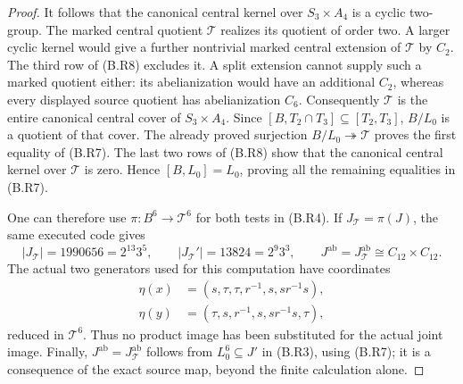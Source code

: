 \begin{proof}
It follows that the canonical central kernel over
$S_3\times A_4$ is a cyclic two-group.  The marked central
quotient $\mathcal T$ realizes its quotient of order two.
A larger cyclic kernel would give a further nontrivial
marked central extension of $\mathcal T$ by $C_2$.
The third row of (B.R8) excludes it.  A split extension
cannot supply such a marked quotient either: its
abelianization would have an additional $C_2$, whereas
every displayed source quotient has abelianization $C_6$.
Consequently $\mathcal T$ is the entire canonical central
cover of $S_3\times A_4$.  Since
$[B,T_2\cap T_3]\subseteq[T_2,T_3]$,
$B/L_0$ is a quotient of that cover.  The already proved
surjection $B/L_0\twoheadrightarrow\mathcal T$ proves
the first equality of (B.R7).  The last two rows of
(B.R8) show that the canonical central kernel over
$\mathcal T$ is zero.  Hence $[B,L_0]=L_0$, proving
all the remaining equalities in (B.R7).

One can therefore use $\pi:B^6\to\mathcal T^6$ for both
tests in (B.R4).  If $J_{\mathcal T}=\pi(J)$, the same
executed code gives
\[
 |J_{\mathcal T}|=1990656=2^{13}3^5,\qquad
 |J_{\mathcal T}'|=13824=2^9 3^3,\qquad
 J^{\mathrm{ab}}=J_{\mathcal T}^{\mathrm{ab}}
                 \cong C_{12}\times C_{12}.                    \tag{B.R9}
\]
The actual two generators used for this computation have
coordinates
\[
\begin{aligned}
 \eta(x)&=(s,\tau,\tau,r^{-1},s,sr^{-1}s),\\
 \eta(y)&=(\tau,s,r^{-1},s,sr^{-1}s,\tau),
\end{aligned}                                                   \tag{B.R10}
\]
reduced in $\mathcal T^6$.  Thus no product image has been
substituted for the actual joint image.  Finally,
$J^{\mathrm{ab}}=J_{\mathcal T}^{\mathrm{ab}}$ follows from
$L_0^6\subseteq J'$ in (B.R3), using (B.R7); it is a
consequence of the exact source map, beyond the finite
calculation alone.
\end{proof}

